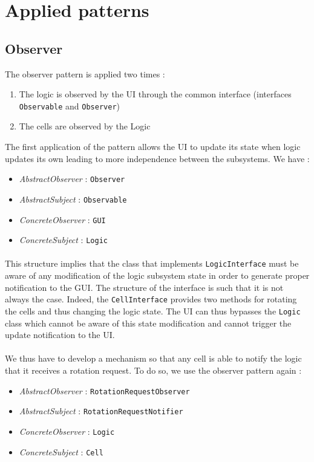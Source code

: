 \documentclass[a4paper,11pt]{article}
\begin{document}
\section{Applied patterns}
\subsection{Observer}
The observer pattern is applied two times : 
\begin{enumerate}
	\item The logic is observed by the UI through the common interface (interfaces \texttt{Observable} and \texttt{Observer})
	\item The cells are observed by the Logic
\end{enumerate}
The first application of the pattern allows the UI to update its state when logic updates its own leading to more independence between the subsystems. We have : 
\begin{itemize}
	\item \textit{AbstractObserver} : \texttt{Observer}
	\item \textit{AbstractSubject} : \texttt{Observable}
	\item \textit{ConcreteObserver} : \texttt{GUI}
	\item \textit{ConcreteSubject} : \texttt{Logic}
\end{itemize}
\paragraph{}
 This structure implies that the class that implements \texttt{LogicInterface} must be aware of any modification of the logic subsystem state in order to generate proper notification to the GUI. The structure of the interface is such that it is not always the case. Indeed, the \texttt{CellInterface} provides two methods for rotating the cells and thus changing the logic state. The UI can thus bypasses the \texttt{Logic} class which cannot be aware of this state modification and cannot trigger the update notification to the UI.
\\ \\ 
We thus have to develop a mechanism so that any cell is able to notify the logic that it receives a rotation request. To do so, we use the observer pattern again :
\begin{itemize}
	\item \textit{AbstractObserver} : \texttt{RotationRequestObserver}
	\item \textit{AbstractSubject} : \texttt{RotationRequestNotifier}
	\item \textit{ConcreteObserver} : \texttt{Logic}
	\item \textit{ConcreteSubject} : \texttt{Cell}
\end{itemize}
\end{document}

